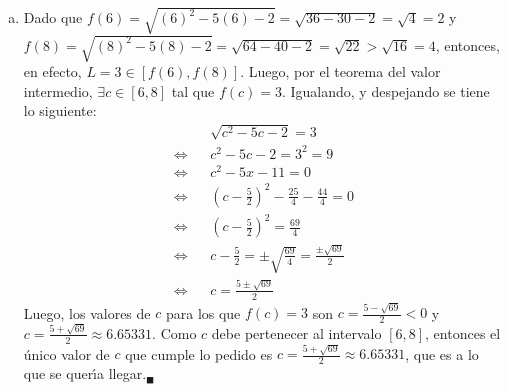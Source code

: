 \begin{solucion}
\begin{enumerate}[(a)]
  \item Dado que $f(6) = \sqrt{(6)^2 - 5(6) - 2} = \sqrt{36 - 30 - 2} = \sqrt{4} = 2$ y $f(8) = \sqrt{(8)^2 - 5(8) - 2} = \sqrt{64 - 40 - 2} = \sqrt{22} > \sqrt{16} = 4$, entonces, en efecto, $L = 3 \in [f(6),f(8)]$. Luego, por el teorema del valor intermedio, $\exists c \in [6,8]$ tal que $f(c) = 3$. Igualando, y despejando se tiene lo siguiente:
  \begin{eqnarray*}
   & & \sqrt{c^2 - 5c - 2} = 3 \\ 
   \Leftrightarrow & & c^2 - 5c -2 = 3^2 = 9 \\
   \Leftrightarrow & & c^2 - 5x - 11 = 0 \\ 
   \Leftrightarrow & & \left( c - \frac{5}{2} \right)^2 - \frac{25}{4} - \frac{44}{4} = 0 \\
   \Leftrightarrow & & \left( c - \frac{5}{2} \right)^2 = \frac{69}{4} \\
   \Leftrightarrow & & c- \frac{5}{2} = \pm  \sqrt{\frac{69}{4}} = \frac{ \pm \sqrt{69}}{2} \\ 
   \Leftrightarrow & & c = \frac{5 \pm \sqrt{69}}{2}
  \end{eqnarray*}
  Luego, los valores de $c$ para los que $f(c) = 3$ son $c = \frac{5-\sqrt{69}}{2} < 0$ y $c = \frac{5+\sqrt{69}}{2} \approx 6.65331$. Como $c$ debe pertenecer al intervalo $[6, 8]$, entonces el \'unico valor de $c$ que cumple lo pedido es $c = \frac{5+\sqrt{69}}{2} \approx 6.65331$, que es a lo que se quer\'{\i}a llegar.${}_{\blacksquare}$
 \end{enumerate}
\end{solucion}

